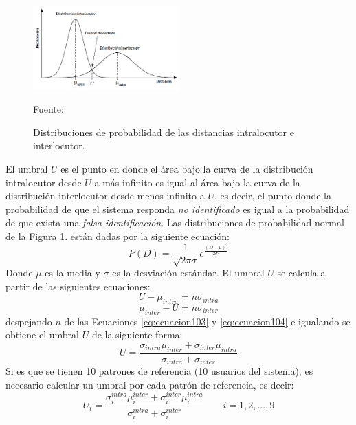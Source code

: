 \begin{enumerate}
\begin{figure}[H]
\begin{center}
\includegraphics[width=0.5\textwidth]{Imagenes/Cap2/image058}
\end{center}
\begin{center}
\vskip -0.5cm
\caption{\small{Distribuciones de probabilidad de las distancias intralocutor e interlocutor.}}
\label{fig:figura2.57}
{\small{Fuente: \cite{varela}}}
\end{center}
\end{figure}

El umbral $U$ es el punto en donde el área bajo la curva de la distribución intralocutor desde $U$ a más infinito es igual al área bajo la curva de la distribución interlocutor desde menos infinito a $U$, es decir, el punto donde la probabilidad de que el sistema responda \textit{no identificado} es igual a la probabilidad de que exista una \textit{falsa identificación}. Las distribuciones de probabilidad normal de la Figura \ref{fig:figura2.57}. están dadas por la siguiente ecuación:
\begin{equation}
\label{eq:ecuacion102}
P(D) = \frac{1}{\sqrt{2 \pi \sigma }}e^{\frac{(D - \mu)^{2}}{2 \sigma^{2}}}
\end{equation}
Donde $\mu$ es la media y $\sigma$ es la desviación estándar. El umbral $U$ se calcula a partir de las siguientes ecuaciones:
\begin{equation}
\label{eq:ecuacion103}
U - \mu_{int ra} = n \sigma_{int ra}
\end{equation}
\begin{equation}
\label{eq:ecuacion104}
\mu_{int er} - U = n \sigma_{int er}
\end{equation}
despejando $n$ de las Ecuaciones \eqref{eq:ecuacion103} y \eqref{eq:ecuacion104} e igualando se obtiene el umbral $U$ de la siguiente forma:
\begin{equation}
\label{eq:ecuacion105}
U = \frac{\sigma_{int ra}\mu_{int er} + \sigma_{int er}\mu_{int ra}}{\sigma_{int ra} + \sigma_{int er}}
\end{equation}
Si es que se tienen 10 patrones de referencia (10 usuarios del sistema), es necesario calcular un umbral por cada patrón de referencia, es decir:
\begin{equation}
\label{eq:ecuacion106}
U_{i} = \frac{\sigma^{int ra}_{i} \mu^{int er}_{i} + \sigma^{int er}_{i} \mu^{int ra}_{i}}{\sigma^{int ra}_{i} + \sigma^{int er}_{i}}
\qquad
i = 1,2,...,9
\end{equation}
\end{enumerate}
\vskip 0.5cm
